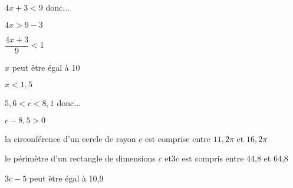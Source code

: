 \begin{QCM}
\begin{GroupeQCM}
\begin{exercice}
\begin{corrige}
\end{corrige}
\end{exercice}





\begin{exercice}
$4x + 3 < 9$ donc...
\begin{ChoixQCM}{4}
\item $4x > 9 - 3$
\item $\dfrac{4x+3}{9}< 1$
\item $x$ peut être égal à 10
\item $x < 1,5$
\end{ChoixQCM}

\begin{corrige}
\end{corrige}
\end{exercice}



\begin{exercice}
$5,6 < c < 8,1$ donc...
\begin{ChoixQCM}{4}
\item $c - 8,5 > 0$
\item la circonférence d'un cercle de rayon $c$ est comprise entre $11,2\pi$ et $16,2\pi$ 
\item le périmètre d'un rectangle de dimensions $c$ et$3c$ est compris entre 44,8 et 64,8
\item $3c-5$ peut être égal à 10,9
\end{ChoixQCM}

\begin{corrige}
\end{corrige}
\end{exercice}


\end{GroupeQCM}
\end{QCM}